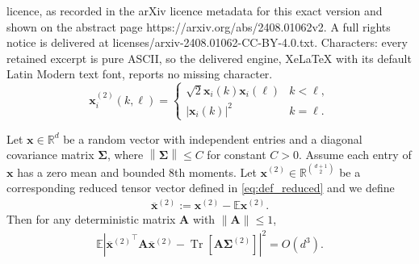 \documentclass[10pt,a4paper]{amsart}
\newcommand{\E}{\mathbb{E}}
\newcommand{\Tr}{\operatorname{Tr}}
\newcommand{\abs}[1]{\left|#1\right|}
\def\bA{{\boldsymbol A}}
\def\bSigma{{\boldsymbol \Sigma}}
\def\bx{{\boldsymbol x}}
\newcommand{\norm}[1]{\left\|#1\right\|}
\begin{document}
licence, as recorded in the arXiv licence metadata for this exact version and shown on the abstract page https://arxiv.org/abs/2408.01062v2. A full rights notice is delivered at licenses/arxiv-2408.01062-CC-BY-4.0.txt. Characters: every retained excerpt is pure ASCII, so the delivered engine, XeLaTeX with its default Latin Modern text font, reports no missing character.
    \begin{equation}\label{eq:def_reduced}
    \bx_{i}^{(2)} (k,\ell)=
    \begin{cases}
        \sqrt{2}\bx_i(k)\bx_i(\ell) & k<\ell,\\
        \abs{\bx_i(k)}^2 & k=\ell.
    \end{cases}
    \end{equation}

\begin{lemma} Let $\bx\in \mathbb R^d$ be a random vector with independent entries and a diagonal covariance matrix $\bSigma$, where $\norm{\bSigma}\leq C$ for constant $C>0$. Assume each entry of $\bx$ has a zero mean and bounded 8th moments.   Let $\bx^{(2)}\in \mathbb R^{\binom{d+1}{2}}$ be a corresponding reduced tensor  vector  defined in \eqref{eq:def_reduced} and we define
      \begin{align}\label{eq:centered_x2}
      \overline\bx^{(2)}:=\bx^{(2)}-\E \bx^{(2)}.
      \end{align}
Then for any deterministic matrix $\bA$ with $\|\bA\|\leq 1$,
\begin{align}\label{eq:BZ_tensor}
    \E\left| {\overline\bx^{(2)}}^\top \bA\overline\bx^{(2)} -\Tr[\bA \bSigma^{(2)}]\right|^2=O(d^3).
     \end{align}
\end{lemma}
\end{document}
